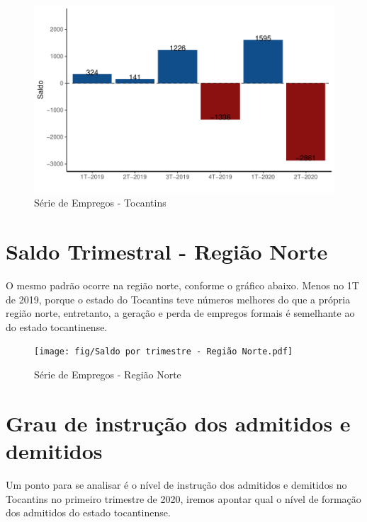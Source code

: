 \begin{figure}[h]
	\caption{Série de Empregos - Tocantins}
	\includegraphics[width=\linewidth]{fig/Saldo por trimestre - Tocantins.pdf}
\end{figure}

\section{Saldo Trimestral - Região Norte}
\par O mesmo padrão ocorre na região norte, conforme o gráfico abaixo. Menos no 1T de 2019, porque o estado do Tocantins teve números melhores do que a própria região norte, entretanto, a geração e perda de empregos formais é semelhante ao do estado tocantinense.

\begin{figure}[h]
	\caption{Série de Empregos - Região Norte}
	\texttt{[image: fig/Saldo por trimestre - Região Norte.pdf]}
\end{figure}

\section{Grau de instrução dos admitidos e demitidos}

\par Um ponto para se analisar é o nível de instrução dos admitidos e demitidos no Tocantins no primeiro trimestre de 2020, iremos apontar qual o nível de formação dos admitidos do estado tocantinense.

